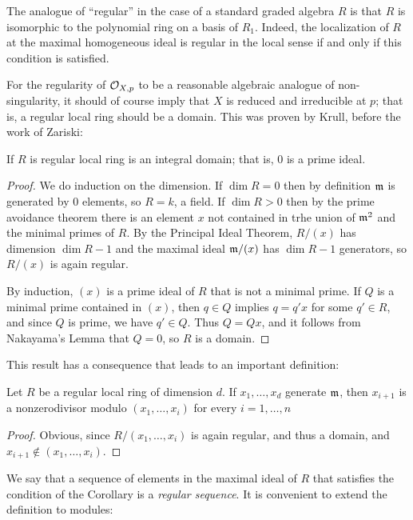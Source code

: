 The analogue of ``regular'' in the case of a standard graded algebra $R$ is that $R$ is isomorphic to the 
polynomial ring on a basis of $R_{1}$. Indeed, the localization of $R$ at the maximal homogeneous ideal is regular in the local sense if and only if this condition is satisfied.

For the regularity of $\sO_{X,p}$ to be a reasonable algebraic analogue of non-singularity, it should of course imply
that $X$ is reduced and irreducible at $p$; that is, a regular local ring should be a domain. This was proven by Krull, before the work of Zariski:

\begin{proposition}
 If $R$ is regular local ring is an integral domain; that is, 0 is a prime ideal.
\end{proposition}
\begin{proof}
 We do induction on the dimension. If $\dim R = 0$ then by definition $\gm$ is generated by 0 elements, so $R = k$,
 a field. If $\dim R>0$ then by the prime avoidance theorem \cite[]{E} there is an element $x$ not contained in trhe union of $\gm^{2}$ and the minimal primes of $R$. By the Principal Ideal Theorem, $R/(x)$ has dimension $\dim R -1$ and the maximal ideal $\gm/(x)$ has $\dim R-1$ generators, so $R/(x)$ is again regular.
 
 By induction, $(x)$ is a prime ideal of $R$ that is not a minimal prime. If $Q$ is a minimal prime contained in $(x)$,
 then $q\in Q$ implies $q = q'x$ for some $q'\in R$, and since $Q$ is prime, we have $q'\in Q$. Thus
 $Q = Qx$, and it follows from Nakayama's Lemma that $Q=0$, so $R$ is a domain.
\end{proof}

This result has a consequence that leads to an important definition:

\begin{corollary}
 Let $R$ be a regular local ring of dimension $d$. If $x_{1}, \dots, x_{d}$  generate $\gm$, then 
 $x_{i+1}$ is a nonzerodivisor modulo $(x_{1}, \dots, x_{i})$ for every $i = 1,\dots, n$
\end{corollary}
\begin{proof}
 Obvious, since $R/(x_{1},\dots, x_{i})$ is again regular, and thus a domain, and $x_{i+1}\notin (x_{1},\dots,x_{i})$.
\end{proof}

We say that a sequence of elements in the maximal ideal of $R$ that satisfies the condition of the Corollary is a \emph{regular sequence}. It is convenient to extend
the definition to modules:

